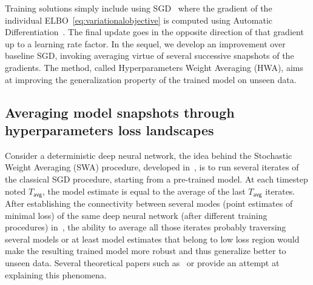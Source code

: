 \documentclass[tablecaption=bottom,wcp]{jmlr}
\begin{document}
Training solutions simply include using SGD~\citep{bottou2008tradeoffs} where the gradient of the individual ELBO~\eqref{eq:variationalobjective} is computed using Automatic Differentiation~\citep{kucukelbir2017automatic}. 
The final update goes in the opposite direction of that gradient up to a learning rate factor.
In the sequel, we develop an improvement over baseline SGD, invoking averaging virtue of several successive snapshots of the gradients.
The method, called Hyperparameters Weight Averaging (HWA), aims at improving the generalization property of the trained model on unseen data.


\subsection{Averaging model snapshots through hyperparameters loss landscapes}
Consider a deterministic deep neural network, the idea behind the Stochastic Weight Averaging (SWA) procedure, developed in~\citep{izmailov2018averaging}, is to run several iterates of the classical SGD procedure, starting from a pre-trained model.
At each timestep noted $T_{\mathsf{avg}}$, the model estimate is equal to the average of the last $T_{\mathsf{avg}}$ iterates.
After establishing the connectivity between several modes (point estimates of minimal loss) of the same deep neural network (after different training procedures) in~\citep{garipov2018loss}, the ability to average all those iterates probably traversing several models or at least model estimates that belong to low loss region would make the resulting trained model more robust and thus generalize better to unseen data.
Several theoretical papers such as~\citep{he2019asymmetric} or \citep{keskar2016large} provide an attempt at explaining this phenomena.
\end{document}

